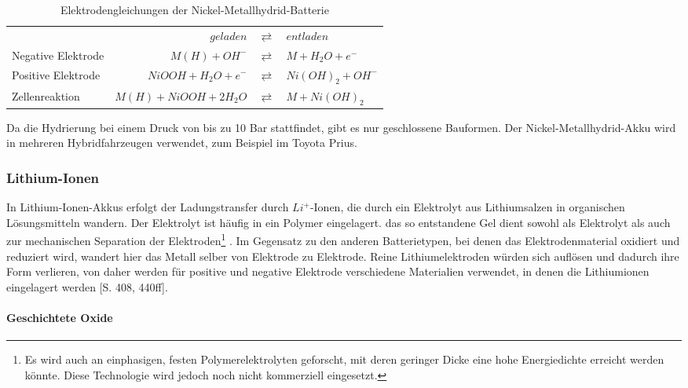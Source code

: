 \begin{table}\centering %
	\begin{tabularx}{\linewidth}{XrcX}
		&              $geladen$ & $\rightleftarrows$ & $entladen$        \\
		Negative Elektrode &          $M(H) + OH^-$ & $\rightleftarrows$ & $M + H_2O + e^-$  \\
		Positive Elektrode &   $NiOOH + H_2O + e^-$ & $\rightleftarrows$ & $Ni(OH)_2 + OH^-$ \\ \midrule
		Zellenreaktion     & $M(H) + NiOOH + 2H_2O$ & $\rightleftarrows$ & $M + Ni(OH)_2$    \\
	\end{tabularx}
	\caption{Elektrodengleichungen der Nickel-Metallhydrid-Batterie}
	\label{NiMH}
\end{table}

Da die Hydrierung bei einem Druck von bis zu 10 Bar stattfindet, gibt es nur geschlossene Bauformen. Der Nickel-Metallhydrid-Akku wird in mehreren Hybridfahrzeugen verwendet, zum Beispiel im Toyota Prius. 

\subsubsection{Lithium-Ionen}
In Lithium-Ionen-Akkus erfolgt der Ladungstransfer durch $Li^+$-Ionen, die durch ein Elektrolyt aus Lithiumsalzen in organischen Lösungsmitteln wandern. Der Elektrolyt ist häufig in ein Polymer eingelagert. das so entstandene Gel dient sowohl als Elektrolyt als auch zur mechanischen Separation der Elektroden\footnote{Es wird auch an einphasigen, festen Polymerelektrolyten geforscht, mit deren geringer Dicke eine hohe Energiedichte erreicht werden könnte. Diese Technologie wird jedoch noch nicht kommerziell eingesetzt.} \cite{xu2004nonaqueous}. Im Gegensatz zu den anderen Batterietypen, bei denen das Elektrodenmaterial oxidiert und reduziert wird, wandert hier das Metall selber von Elektrode zu Elektrode. Reine Lithiumelektroden würden sich auflösen und dadurch ihre Form verlieren, von daher werden für positive und negative Elektrode verschiedene Materialien verwendet, in denen die Lithiumionen eingelagert werden \cite{KiehneBattery}[S. 408, 440ff]. 

\paragraph{Geschichtete Oxide}

